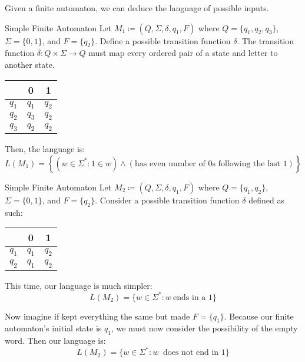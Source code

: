 Given a finite automaton, we can deduce the language of possible inputs.

\begin{exbox}{Simple Finite Automaton}{}
    Let $M_1 \coloneq (Q, \Sigma, \delta, q_1, F)$ where $Q = \{q_1, q_2, q_3\}$, $\Sigma = \{0, 1\}$, and $F = \{q_2\}$. Define a possible transition function $\delta$.
    \tcblower
    The transition function $\delta : Q \times \Sigma \to Q$ must map every ordered pair of a state and letter to another state.

    \begin{center}\begin{tabular}{c | c | c }
        & 0 & 1 \\ \hline
        $q_1$ & $q_1$ & $q_2$ \\
        $q_2$ & $q_3$ & $q_2$ \\
        $q_3$ & $q_2$ & $q_2$
    \end{tabular}\end{center}

    Then, the language is:
    \[ L(M_1) = \left\{ (w \in \Sigma^*: 1 \in w) \land (\text{has even number of 0s following the last 1}) \right\} \]
\end{exbox}

\begin{exbox}{Simple Finite Automaton}{}
    Let $M_2 \coloneq (Q, \Sigma, \delta, q_1, F)$ where $Q = \{q_1, q_2\}$, $\Sigma = \{0, 1\}$, and $F = \{q_2\}$. Consider a possible transition function $\delta$ defined as such:

    \begin{center}\begin{tabular}{c | c | c }
        & 0 & 1 \\ \hline
        $q_1$ & $q_1$ & $q_2$ \\
        $q_2$ & $q_1$ & $q_2$ \\
    \end{tabular}\end{center}

    This time, our language is much simpler:
    \[ L(M_2) = \{ w \in \Sigma^* : w\ \text{ends in a 1} \} \]

    Now imagine if kept everything the same but made $F = \{q_1\}$. Because our finite automaton's initial state is $q_1$, we must now consider the possibility of the empty word. Then our language is:
    \[ L(M_2) = \{ w \in \Sigma^* : w\ \text{ does not end in 1} \} \]
\end{exbox}

